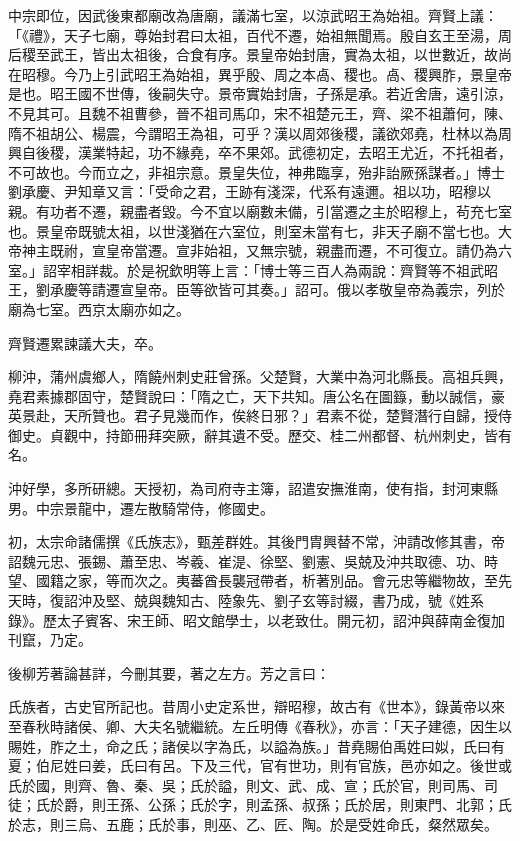 \begin{pinyinscope}
 中宗即位，因武後東都廟改為唐廟，議滿七室，以涼武昭王為始祖。齊賢上議：「《禮》，天子七廟，尊始封君曰太祖，百代不遷，始祖無聞焉。殷自玄王至湯，周后稷至武王，皆出太祖後，合食有序。景皇帝始封唐，實為太祖，以世數近，故尚在昭穆。今乃上引武昭王為始祖，異乎殷、周之本卨、稷也。卨、稷興胙，景皇帝是也。昭王國不世傳，後嗣失守。景帝實始封唐，子孫是承。若近舍唐，遠引涼，不見其可。且魏不祖曹參，晉不祖司馬卬，宋不祖楚元王，齊、梁不祖蕭何，陳、隋不祖胡公、楊震，今謂昭王為祖，可乎？漢以周郊後稷，議欲郊堯，杜林以為周興自後稷，漢業特起，功不緣堯，卒不果郊。武德初定，去昭王尤近，不托祖者，不可故也。今而立之，非祖宗意。景皇失位，神弗臨享，殆非詒厥孫謀者。」博士劉承慶、尹知章又言：「受命之君，王跡有淺深，代系有遠邇。祖以功，昭穆以親。有功者不遷，親盡者毀。今不宜以廟數未備，引當遷之主於昭穆上，茍充七室也。景皇帝既號太祖，以世淺猶在六室位，則室未當有七，非天子廟不當七也。大帝神主既祔，宣皇帝當遷。宣非始祖，又無宗號，親盡而遷，不可復立。請仍為六室。」詔宰相詳裁。於是祝欽明等上言：「博士等三百人為兩說：齊賢等不祖武昭王，劉承慶等請遷宣皇帝。臣等欲皆可其奏。」詔可。俄以孝敬皇帝為義宗，列於廟為七室。西京太廟亦如之。



 齊賢遷累諫議大夫，卒。



 柳沖，蒲州虞鄉人，隋饒州刺史莊曾孫。父楚賢，大業中為河北縣長。高祖兵興，堯君素據郡固守，楚賢說曰：「隋之亡，天下共知。唐公名在圖籙，動以誠信，豪英景赴，天所贊也。君子見幾而作，俟終日邪？」君素不從，楚賢潛行自歸，授侍御史。貞觀中，持節冊拜突厥，辭其遺不受。歷交、桂二州都督、杭州刺史，皆有名。



 沖好學，多所研總。天授初，為司府寺主簿，詔遣安撫淮南，使有指，封河東縣男。中宗景龍中，遷左散騎常侍，修國史。



 初，太宗命諸儒撰《氏族志》，甄差群姓。其後門胄興替不常，沖請改修其書，帝詔魏元忠、張錫、蕭至忠、岑羲、崔湜、徐堅、劉憲、吳兢及沖共取德、功、時望、國籍之家，等而次之。夷蕃酋長襲冠帶者，析著別品。會元忠等繼物故，至先天時，復詔沖及堅、兢與魏知古、陸象先、劉子玄等討綴，書乃成，號《姓系錄》。歷太子賓客、宋王師、昭文館學士，以老致仕。開元初，詔沖與薛南金復加刊竄，乃定。



 後柳芳著論甚詳，今刪其要，著之左方。芳之言曰：



 氏族者，古史官所記也。昔周小史定系世，辯昭穆，故古有《世本》，錄黃帝以來至春秋時諸侯、卿、大夫名號繼統。左丘明傳《春秋》，亦言：「天子建德，因生以賜姓，胙之土，命之氏；諸侯以字為氏，以謚為族。」昔堯賜伯禹姓曰姒，氏曰有夏；伯尼姓曰姜，氏曰有呂。下及三代，官有世功，則有官族，邑亦如之。後世或氏於國，則齊、魯、秦、吳；氏於謚，則文、武、成、宣；氏於官，則司馬、司徒；氏於爵，則王孫、公孫；氏於字，則孟孫、叔孫；氏於居，則東門、北郭；氏於志，則三烏、五鹿；氏於事，則巫、乙、匠、陶。於是受姓命氏，粲然眾矣。




\end{pinyinscope}
